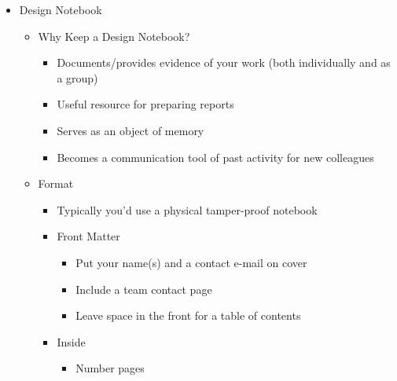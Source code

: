 \begin{itemize}

  \item Design Notebook

    \begin{itemize}

      \item Why Keep a Design Notebook?

        \begin{itemize}

          \item Documents/provides evidence of your work (both individually and as a group)

          \item Useful resource for preparing reports

          \item Serves as an object of memory

          \item Becomes a communication tool of past activity for new colleagues

        \end{itemize}

      \item Format

        \begin{itemize}

          \item Typically you'd use a physical tamper-proof notebook

          \item Front Matter

            \begin{itemize}

              \item Put your name(s) and a contact e-mail on cover

              \item Include a team contact page

              \item Leave space in the front for a table of contents

            \end{itemize}

          \item Inside

            \begin{itemize}

              \item Number pages


\end{itemize}
\end{itemize}
\end{itemize}
\end{itemize}

